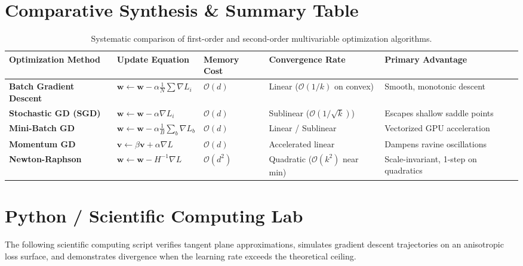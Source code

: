 \section{Comparative Synthesis \& Summary Table}

\begin{table}[htbp]
\centering
\small
\begin{tabular}{p{3.0cm} p{2.6cm} p{2.6cm} p{3.2cm} p{2.6cm}}
\toprule
\textbf{Optimization Method} & \textbf{Update Equation} & \textbf{Memory Cost} & \textbf{Convergence Rate} & \textbf{Primary Advantage} \\
\midrule
\textbf{Batch Gradient Descent} & $\mathbf{w} \leftarrow \mathbf{w} - \alpha \frac{1}{N}\sum \nabla L_i$ & $\mathcal{O}(d)$ & Linear ($\mathcal{O}(1/k)$ on convex) & Smooth, monotonic descent \\
\textbf{Stochastic GD (SGD)} & $\mathbf{w} \leftarrow \mathbf{w} - \alpha \nabla L_i$ & $\mathcal{O}(d)$ & Sublinear ($\mathcal{O}(1/\sqrt{k})$) & Escapes shallow saddle points \\
\textbf{Mini-Batch GD} & $\mathbf{w} \leftarrow \mathbf{w} - \alpha \frac{1}{B}\sum_{b} \nabla L_b$ & $\mathcal{O}(d)$ & Linear / Sublinear & Vectorized GPU acceleration \\
\textbf{Momentum GD} & $\mathbf{v} \leftarrow \beta \mathbf{v} + \alpha \nabla L$ & $\mathcal{O}(d)$ & Accelerated linear & Dampens ravine oscillations \\
\textbf{Newton-Raphson} & $\mathbf{w} \leftarrow \mathbf{w} - H^{-1} \nabla L$ & $\mathcal{O}(d^2)$ & Quadratic ($\mathcal{O}(k^2)$ near min) & Scale-invariant, 1-step on quadratics \\
\bottomrule
\end{tabular}
\caption{Systematic comparison of first-order and second-order multivariable optimization algorithms.}
\label{tab:optimization_algorithms_comparison}
\end{table}

\section{Python / Scientific Computing Lab}

The following scientific computing script verifies tangent plane approximations, simulates gradient descent trajectories on an anisotropic loss surface, and demonstrates divergence when the learning rate exceeds the theoretical ceiling.

